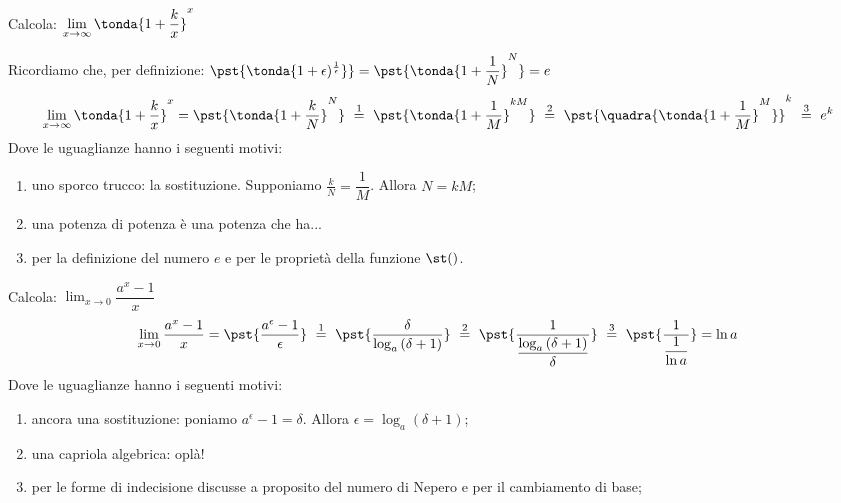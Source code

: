 \begin{esempio}
Calcola: \quad 
  \(\displaystyle \lim_{x \rightarrow \infty} \tonda{1+\dfrac{k}{x}}^x\)
  
Ricordiamo che, per definizione:  
\(\pst{\tonda{1+\epsilon)^{\frac{1}{\epsilon}}}} = 
  \pst{\tonda{1+\dfrac{1}{N}}^N} = e\)
\begin{align*}
 \lim_{x \rightarrow \infty} \tonda{1+\dfrac{k}{x}}^x =
 \pst{\tonda{1+\dfrac{k}{N}}^N}
~ \stackrel{1}{=} ~  
\pst{\tonda{1+\dfrac{1}{M}}^{kM}}
~ \stackrel{2}{=} ~
\pst{\quadra{\tonda{1+\dfrac{1}{M}}^M}}^k
~ \stackrel{3}{=} ~ e^k
\end{align*}
Dove le uguaglianze hanno i seguenti motivi:
\begin{enumerate} [nosep]
 \item uno sporco trucco: la sostituzione. Supponiamo
\(\frac{k}{N}=\dfrac{1}{M}\). Allora \(N=kM\);
 \item una potenza di potenza è una potenza che ha...
 \item per la definizione del numero \(e\) e per le proprietà della funzione 
\(\st()\).
\end{enumerate}
\end{esempio}

\begin{esempio}
Calcola: \quad 
  \(\displaystyle \lim_{x \rightarrow 0} \dfrac{a^x-1}{x}\)
\begin{align*}
\lim_{x \rightarrow 0} \dfrac{a^x-1}{x} =
\pst{\dfrac{a^\epsilon-1}{\epsilon}}
~ \stackrel{1}{=} ~  
\pst{\dfrac{\delta}{\log_a{(\delta+1)}}}
~ \stackrel{2}{=} ~
\pst{\frac{1}{\dfrac{\log_a{(\delta+1)}}{\delta}}}
~ \stackrel{3}{=} ~ 
\pst{\frac{1}{\dfrac{1}{\ln{a}}}}=\ln{a}
\end{align*}
Dove le uguaglianze hanno i seguenti motivi:
\begin{enumerate} [nosep]
 \item ancora una sostituzione: poniamo
\(a^\epsilon-1=\delta\). Allora \(\epsilon=\log_a(\delta+1)\);
 \item una capriola algebrica: oplà! 
 \item per le forme di indecisione discusse a proposito del numero di Nepero
e per il cambiamento di base;
\end{enumerate}
\end{esempio}

